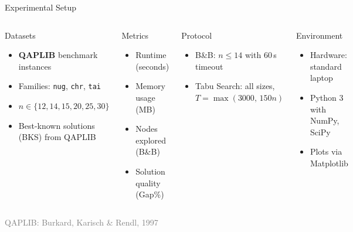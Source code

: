 \documentclass[aspectratio=169,11pt]{beamer}
\newcommand{\reference}[1]{\hfill{\scriptsize\textcolor{gray}{#1}}}
\begin{document}

\begin{frame}{Experimental Setup}
\begin{columns}[T]
\begin{block}{Datasets}
\begin{itemize}
  \item \textbf{QAPLIB} benchmark instances
  \item Families: \texttt{nug}, \texttt{chr}, \texttt{tai}
  \item $n\in\{12,14,15,20,25,30\}$
  \item Best-known solutions (BKS) from QAPLIB
\end{itemize}
\end{block}
\begin{block}{Metrics}
\begin{itemize}
  \item Runtime (seconds)
  \item Memory usage (MB)
  \item Nodes explored (B\&B)
  \item Solution quality (Gap\%)
\end{itemize}
\end{block}

\begin{block}{Protocol}
\begin{itemize}
  \item B\&B: $n\le 14$ with 60\,s timeout
  \item Tabu Search: all sizes, $T=\max(3000,\,150n)$
\end{itemize}
\end{block}
\begin{block}{Environment}
\begin{itemize}
  \item Hardware: standard laptop
  \item Python 3 with NumPy, SciPy
  \item Plots via Matplotlib
\end{itemize}
\end{block}
\end{columns}
\vspace{4pt}
\reference{QAPLIB: Burkard, Karisch \& Rendl, 1997}
\end{frame}
\end{document}
